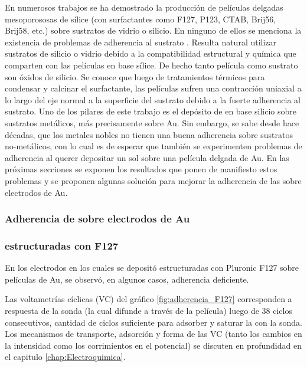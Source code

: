		 En numerosos trabajos se ha demostrado la producción de películas delgadas mesoporososas de sílice (con surfactantes como F127, P123, CTAB, Brij56, Brij58, etc.) sobre sustratos de vidrio o silicio. En ninguno de ellos se menciona la existencia de problemas de adherencia al sustrato \cite{Angelome2008,Fuertes2010,Violi2015}. Resulta natural utilizar sustratos de silicio o vidrio debido a la compatibilidad estructural y química que comparten con las películas en base sílice. De hecho tanto película como sustrato son óxidos de silicio. Se conoce que luego de tratamientos térmicos para condensar y calcinar el surfactante, las películas sufren una contracción uniaxial a lo largo del eje normal a la superficie del sustrato debido a la fuerte adherencia al sustrato.\cite{Grosso2004,Soler-Illia2012,Chougnet2005} Uno de los pilares de este trabajo es el depósito de \pdm\space en base silicio sobre sustratos metálicos, más precisamente sobre Au. Sin embargo, se sabe desde hace décadas, que los metales nobles no tienen una buena adherencia sobre sustratos no-metálicos\cite{Kern1990,Hieber1976}, con lo cual es de esperar que también se experimenten problemas de adherencia al querer depositar un sol sobre una película delgada de Au. \cite{Meyer2004,Nugen2009,nasa1973} En las próximas secciones se exponen los resultados que ponen de manifiesto estos problemas y se proponen algunas solución para mejorar la adherencia de las \pdm\space sobre electrodos de Au.

		\subsubsection{Adherencia de \pdm\space sobre electrodos de Au}

			\subsubsection*{\pdm\space estructuradas con F127}

			En los electrodos en los cuales se depositó \pdm\space estructuradas con Pluronic F127 sobre películas de Au, se observó, en algunos casos, adherencia deficiente. 
			
			Las voltametrías cíclicas (VC) del gráfico \ref{fig:adherencia_F127} corresponden a respuesta de la sonda \aminorutenio (la cual difunde a través de la película) luego de 38 ciclos consecutivos, cantidad de ciclos suficiente para adsorber y saturar la \pdm\space con la sonda. Los mecanismos de transporte, adsorción y forma de las VC (tanto los cambios en la intensidad como los corrimientos en el potencial) se discuten en profundidad en el capitulo \ref{chap:Electroquimica}. 
			
